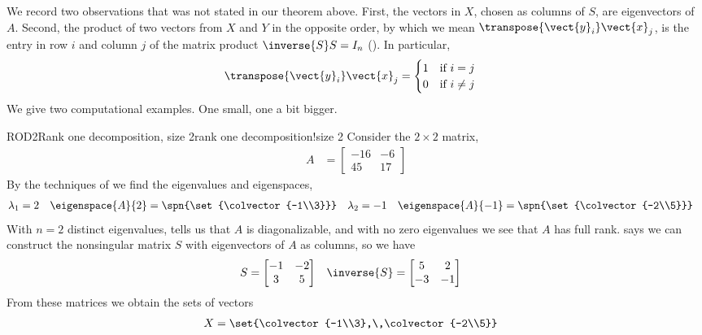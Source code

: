 %
We record two observations that was not stated in our theorem above.  First, the vectors in $X$, chosen as columns of $S$, are eigenvectors of $A$.  Second, the product of two vectors from $X$ and $Y$ in the opposite order, by which we mean $\transpose{\vect{y}_i}\vect{x}_j$, is the entry in row $i$ and column $j$ of the matrix product $\inverse{S}S=I_n$ ().  In particular,
%
\begin{align*}
\transpose{\vect{y}_i}\vect{x}_j
&=
\begin{cases}
1&\text{if $i=j$}\\
0&\text{if $i\neq j$}
\end{cases}
\end{align*}
%
We give two computational examples.  One small, one a bit bigger.
%
\begin{example}{ROD2}{Rank one decomposition, size 2}{rank one decomposition!size 2}
Consider the $2\times 2$ matrix,
%
\begin{align*}
A&=
\begin{bmatrix}
 -16 & -6 \\
 45 & 17
\end{bmatrix}
%
\end{align*}
%
By the techniques of  we find the eigenvalues and eigenspaces,
%
\begin{align*}
\lambda_1&=2
&
\eigenspace{A}{2}&=\spn{\set{\colvector{-1\\3}}}
&
\lambda_2&=-1
&
\eigenspace{A}{-1}&=\spn{\set{\colvector{-2\\5}}}
\end{align*}
%
With $n=2$ distinct eigenvalues,  tells us that $A$ is diagonalizable, and with no zero eigenvalues we see that $A$ has full rank.   says we can construct the nonsingular matrix $S$ with eigenvectors of $A$ as columns, so we have
%
\begin{align*}
S&=
\begin{bmatrix}
-1 & -2 \\
3 & 5
\end{bmatrix}
&
\inverse{S}&=
%
\begin{bmatrix}
5 & 2 \\
-3 & -1
\end{bmatrix}
%
\end{align*}
%
From these matrices we obtain the sets of vectors
%
\begin{align*}
X&=\set{\colvector{-1\\3},\,\colvector{-2\\5}}

\end{align*}
\end{example}
